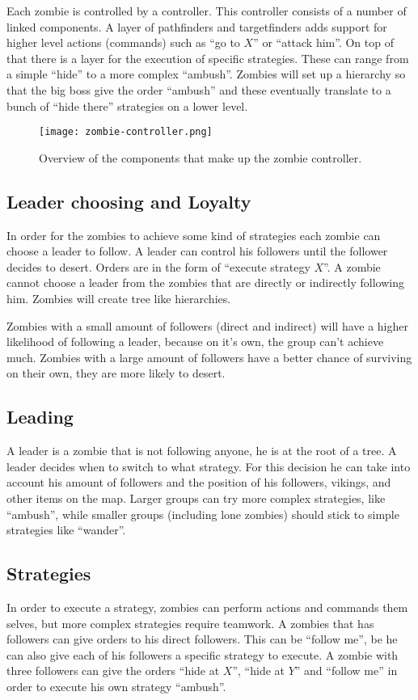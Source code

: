 Each zombie is controlled by a controller. This controller consists of a number of linked components. A layer of pathfinders and targetfinders adds support for higher level actions (commands) such as ``go to $X$'' or ``attack him''. On top of that there is a layer for the execution of specific strategies. These can range from a simple ``hide'' to a more complex ``ambush''. Zombies will set up a hierarchy so that the big boss give the order ``ambush'' and these eventually translate to a bunch of ``hide there'' strategies on a lower level.

\begin{figure}[!htb]
	\centering
	\texttt{[image: zombie-controller.png]}
	\caption{Overview of the components that make up the zombie controller.}
\end{figure}

\subsection{Leader choosing and Loyalty}
In order for the zombies to achieve some kind of strategies each zombie can choose a leader to follow. A leader can control his followers until the follower decides to desert. Orders are in the form of ``execute strategy $X$''. A zombie cannot choose a leader from the zombies that are directly or indirectly following him. Zombies will create tree like hierarchies.

Zombies with a small amount of followers (direct and indirect) will have a higher likelihood of following a leader, because on it's own, the group can't achieve much. Zombies with a large amount of followers have a better chance of surviving on their own, they are more likely to desert.

\subsection{Leading}
A leader is a zombie that is not following anyone, he is at the root of a tree. A leader decides when to switch to what strategy. For this decision he can take into account his amount of followers and the position of his followers, vikings, and other items on the map. Larger groups can try more complex strategies, like ``ambush'', while smaller groups (including lone zombies) should stick to simple strategies like ``wander''.

\subsection{Strategies}
In order to execute a strategy, zombies can perform actions and commands them selves, but more complex strategies require teamwork. A zombies that has followers can give orders to his direct followers. This can be ``follow me'', be he can also give each of his followers a specific strategy to execute. A zombie with three followers can give the orders ``hide at $X$'', ``hide at $Y$'' and ``follow me'' in order to execute his own strategy ``ambush''.
